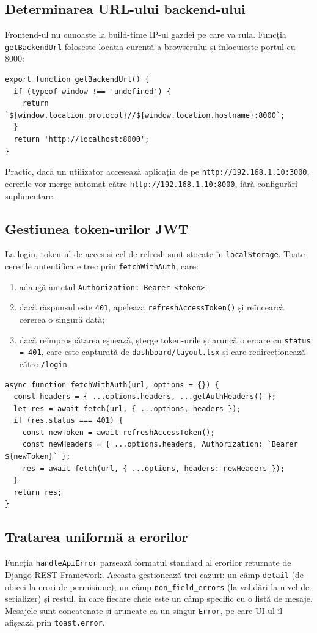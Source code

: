 \subsection{Determinarea URL-ului backend-ului}
Frontend-ul nu cunoaște la build-time IP-ul gazdei pe care va rula. Funcția \texttt{getBackendUrl} folosește locația curentă a browserului și înlocuiește portul cu 8000:
\begin{verbatim}
export function getBackendUrl() {
  if (typeof window !== 'undefined') {
    return `${window.location.protocol}//${window.location.hostname}:8000`;
  }
  return 'http://localhost:8000';
}
\end{verbatim}
Practic, dacă un utilizator accesează aplicația de pe \texttt{http://192.168.1.10:3000}, cererile vor merge automat către \texttt{http://192.168.1.10:8000}, fără configurări suplimentare.

\subsection{Gestiunea token-urilor JWT}
La login, token-ul de acces și cel de refresh sunt stocate în \texttt{localStorage}. Toate cererile autentificate trec prin \texttt{fetchWithAuth}, care:
\begin{enumerate}
    \item adaugă antetul \texttt{Authorization: Bearer <token>};
    \item dacă răspunsul este \texttt{401}, apelează \texttt{refreshAccessToken()} și reîncearcă cererea o singură dată;
    \item dacă reîmprospătarea eșuează, șterge token-urile și aruncă o eroare cu \texttt{status = 401}, care este capturată de \texttt{dashboard/layout.tsx} și care redirecționează către \texttt{/login}.
\end{enumerate}
\begin{verbatim}
async function fetchWithAuth(url, options = {}) {
  const headers = { ...options.headers, ...getAuthHeaders() };
  let res = await fetch(url, { ...options, headers });
  if (res.status === 401) {
    const newToken = await refreshAccessToken();
    const newHeaders = { ...options.headers, Authorization: `Bearer ${newToken}` };
    res = await fetch(url, { ...options, headers: newHeaders });
  }
  return res;
}
\end{verbatim}

\subsection{Tratarea uniformă a erorilor}
Funcția \texttt{handleApiError} parsează formatul standard al erorilor returnate de Django REST Framework. Aceasta gestionează trei cazuri: un câmp \texttt{detail} (de obicei la erori de permisiune), un câmp \texttt{non\_field\_errors} (la validări la nivel de serializer) și restul, în care fiecare cheie este un câmp specific cu o listă de mesaje. Mesajele sunt concatenate și aruncate ca un singur \texttt{Error}, pe care UI-ul îl afișează prin \texttt{toast.error}.


